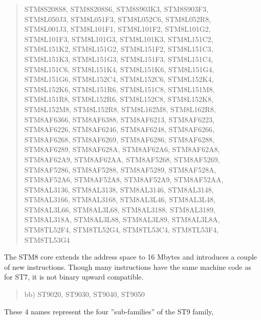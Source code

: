 \documentclass[12pt,twoside]{report}
\begin{document}
\begin{quote}
    STM8S208S8, STM8S208S6, STM8S903K3, STM8S903F3,\\
    STM8L050J3, STM8L051F3, STM8L052C6, STM8L052R8,\\
    STM8L001J3, STM8L101F1, STM8L101F2, STM8L101G2,\\
    STM8L101F3, STM8L101G3, STM8L101K3, STM8L151C2,\\
    STM8L151K2, STM8L151G2, STM8L151F2, STM8L151C3,\\
    STM8L151K3, STM8L151G3, STM8L151F3, STM8L151C4,\\
    STM8L151C6, STM8L151K4, STM8L151K6, STM8L151G4,\\
    STM8L151G6, STM8L152C4, STM8L152C6, STM8L152K4,\\
    STM8L152K6, STM8L151R6, STM8L151C8, STM8L151M8,\\
    STM8L151R8, STM8L152R6, STM8L152C8, STM8L152K8,\\
    STM8L152M8, STM8L152R8, STM8L162M8, STM8L162R8,\\
    STM8AF6366, STM8AF6388, STM8AF6213, STM8AF6223,\\
    STM8AF6226, STM8AF6246, STM8AF6248, STM8AF6266,\\
    STM8AF6268, STM8AF6269, STM8AF6286, STM8AF6288,\\
    STM8AF6289, STM8AF628A, STM8AF62A6, STM8AF62A8,\\
    STM8AF62A9, STM8AF62AA, STM8AF5268, STM8AF5269,\\
    STM8AF5286, STM8AF5288, STM8AF5289, STM8AF528A,\\
    STM8AF52A6, STM8AF52A8, STM8AF52A9, STM8AF52AA,\\
    STM8AL3136, STM8AL3138, STM8AL3146, STM8AL3148,\\
    STM8AL3166, STM8AL3168, STM8AL3L46, STM8AL3L48,\\
    STM8AL3L66, STM8AL3L68, STM8AL3188, STM8AL3189,\\
    STM8AL318A, STM8AL3L88, STM8AL3L89, STM8AL3L8A,\\
    STM8TL52F4, STM8TL52G4, STM8TL53C4, STM8TL53F4,\\
    STM8TL53G4
\end{quote}
The STM8 core extends the address space to 16 Mbytes and introduces
a couple of new instructions.  Though many instructions have the same
machine code as for ST7, it is not binary upward compatible.
\begin{quote}
bb) ST9020, ST9030, ST9040, ST9050
\end{quote}
These 4 names represent the four ''sub-families'' of the ST9 family,
\end{document}
